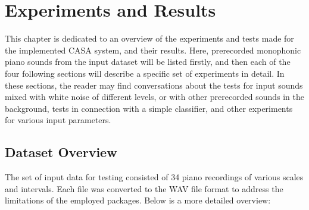\chapter{Experiments and Results}\label{chapter:experiments}

This chapter is dedicated to an overview of the experiments and tests made for the implemented CASA system, and their results. Here, prerecorded monophonic piano sounds from the input dataset will be listed firstly, and then each of the four following sections will describe a specific set of experiments in detail. In these sections, the reader may find conversations about the tests for input sounds mixed with white noise of different levels, or with other prerecorded sounds in the background, tests in connection with a simple classifier, and other experiments for various input parameters.

\section{Dataset Overview}\label{section:experiments_dataset}

The set of input data for testing consisted of 34 piano recordings of various scales and intervals. Each file was converted to the WAV file format to address the limitations of the employed packages. Below is a more detailed overview:

